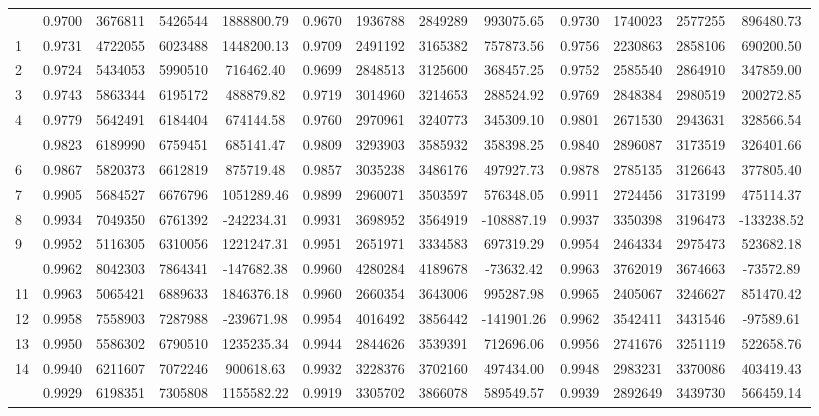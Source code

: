 \documentclass[
  12pt,
]{article}
\begin{document}
\begin{longtable}[t]{lcccccccccccc}
\endfoot
\bottomrule
\endlastfoot
0 & 0.9700 & 3676811 & 5426544 & 1888800.79 & 0.9670 & 1936788 & 2849289 & 993075.65 & 0.9730 & 1740023 & 2577255 & 896480.73\\
1 & 0.9731 & 4722055 & 6023488 & 1448200.13 & 0.9709 & 2491192 & 3165382 & 757873.56 & 0.9756 & 2230863 & 2858106 & 690200.50\\
2 & 0.9724 & 5434053 & 5990510 & 716462.40 & 0.9699 & 2848513 & 3125600 & 368457.25 & 0.9752 & 2585540 & 2864910 & 347859.00\\
3 & 0.9743 & 5863344 & 6195172 & 488879.82 & 0.9719 & 3014960 & 3214653 & 288524.92 & 0.9769 & 2848384 & 2980519 & 200272.85\\
4 & 0.9779 & 5642491 & 6184404 & 674144.58 & 0.9760 & 2970961 & 3240773 & 345309.10 & 0.9801 & 2671530 & 2943631 & 328566.54\\
\addlinespace
5 & 0.9823 & 6189990 & 6759451 & 685141.47 & 0.9809 & 3293903 & 3585932 & 358398.25 & 0.9840 & 2896087 & 3173519 & 326401.66\\
6 & 0.9867 & 5820373 & 6612819 & 875719.48 & 0.9857 & 3035238 & 3486176 & 497927.73 & 0.9878 & 2785135 & 3126643 & 377805.40\\
7 & 0.9905 & 5684527 & 6676796 & 1051289.46 & 0.9899 & 2960071 & 3503597 & 576348.05 & 0.9911 & 2724456 & 3173199 & 475114.37\\
8 & 0.9934 & 7049350 & 6761392 & -242234.31 & 0.9931 & 3698952 & 3564919 & -108887.19 & 0.9937 & 3350398 & 3196473 & -133238.52\\
9 & 0.9952 & 5116305 & 6310056 & 1221247.31 & 0.9951 & 2651971 & 3334583 & 697319.29 & 0.9954 & 2464334 & 2975473 & 523682.18\\
\addlinespace
10 & 0.9962 & 8042303 & 7864341 & -147682.38 & 0.9960 & 4280284 & 4189678 & -73632.42 & 0.9963 & 3762019 & 3674663 & -73572.89\\
11 & 0.9963 & 5065421 & 6889633 & 1846376.18 & 0.9960 & 2660354 & 3643006 & 995287.98 & 0.9965 & 2405067 & 3246627 & 851470.42\\
12 & 0.9958 & 7558903 & 7287988 & -239671.98 & 0.9954 & 4016492 & 3856442 & -141901.26 & 0.9962 & 3542411 & 3431546 & -97589.61\\
13 & 0.9950 & 5586302 & 6790510 & 1235235.34 & 0.9944 & 2844626 & 3539391 & 712696.06 & 0.9956 & 2741676 & 3251119 & 522658.76\\
14 & 0.9940 & 6211607 & 7072246 & 900618.63 & 0.9932 & 3228376 & 3702160 & 497434.00 & 0.9948 & 2983231 & 3370086 & 403419.43\\
\addlinespace
15 & 0.9929 & 6198351 & 7305808 & 1155582.22 & 0.9919 & 3305702 & 3866078 & 589549.57 & 0.9939 & 2892649 & 3439730 & 566459.14\\

\end{longtable}
\end{document}
